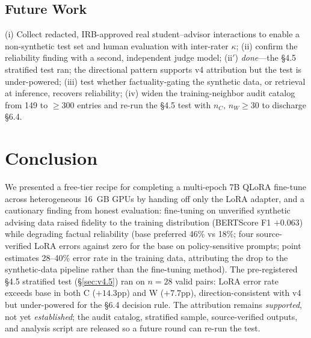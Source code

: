 \documentclass[11pt]{article}
\begin{document}
\subsection{Future Work}
(i) Collect redacted, IRB-approved real student--advisor interactions to enable a non-synthetic test set and human evaluation with inter-rater $\kappa$; (ii) confirm the reliability finding with a second, independent judge model; (ii$'$) \emph{done}---the §4.5 stratified test ran; the directional pattern supports v4 attribution but the test is under-powered; (iii) test whether factuality-gating the synthetic data, or retrieval at inference, recovers reliability; (iv) widen the training-neighbor audit catalog from 149 to $\ge$300 entries and re-run the §4.5 test with $n_C,\,n_W\!\ge\!30$ to discharge §6.4.

\section{Conclusion}
We presented a free-tier recipe for completing a multi-epoch 7B QLoRA fine-tune across heterogeneous 16~GB GPUs by handing off only the LoRA adapter, and a cautionary finding from honest evaluation: fine-tuning on unverified synthetic advising data raised fidelity to the training distribution (BERTScore F1 $+0.063$) while degrading factual reliability (base preferred 46\% vs 18\%; four source-verified LoRA errors against zero for the base on policy-sensitive prompts; point estimates 28--40\% error rate in the training data, attributing the drop to the synthetic-data pipeline rather than the fine-tuning method). The pre-registered §4.5 stratified test (\S\ref{sec:v4.5}) ran on $n{=}28$ valid pairs: LoRA error rate exceeds base in both C ($+14.3$pp) and W ($+7.7$pp), direction-consistent with v4 but under-powered for the §6.4 decision rule. The attribution remains \emph{supported}, not yet \emph{established}; the audit catalog, stratified sample, source-verified outputs, and analysis script are released so a future round can re-run the test.
\end{document}
